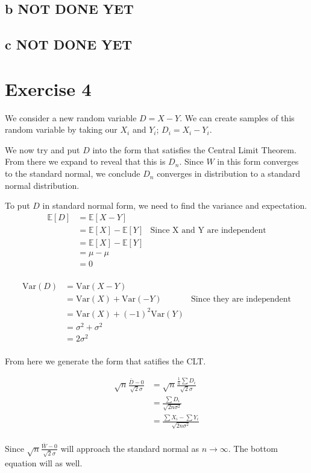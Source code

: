 \documentclass{article}
\newcommand{\expect}{\mathbb{E}}
\newcommand{\var}{\text{Var}}
\begin{document}
\subsection{b NOT DONE YET}

\subsection{c NOT DONE YET}

\section{Exercise 4}
We consider a new random variable $D = X - Y$. We can create samples of this
random variable by taking our $X_i$ and $Y_i$; $D_i = X_i - Y_i$.

We now try and put $D$ into the form that satisfies the Central Limit Theorem.
From there we expand to reveal that this is $D_n$. Since $W$ in this form
converges to the standard normal, we conclude $D_n$ converges in distribution
to a standard normal distribution.

To put $D$ in standard normal form, we need to find the variance and expectation.
\begin{align*}
    \expect [D] &= \expect [X - Y] \\
    &= \expect [X] - \expect [Y] & \text{Since X and Y are independent} \\
    &= \expect [X] - \expect [Y] \\
    &= \mu - \mu \\
    &= 0 \\
\end{align*}

\begin{align*}
    \var (D) &= \var (X - Y) \\
    &= \var (X)+ \var(-Y) & \text{Since they are independent} \\
    &= \var (X)+ {(-1)}^2 \var(Y) \\
    &= \sigma^2 + \sigma^2 \\
    &= 2 \sigma^2 \\
\end{align*}

From here we generate the form that satifies the CLT\@.

\begin{align*}
    \sqrt{n} \frac{\bar{D} - 0}{\sqrt{2} \sigma}
    &= \sqrt{n} \frac{\frac{1}{n}\sum D_i}{\sqrt{2} \sigma} \\
    &= \frac{\sum D_i}{\sqrt{2n\sigma^2}} \\
    &= \frac{\sum X_i - \sum Y_i}{\sqrt{2n\sigma^2}} \\
\end{align*}

Since $\sqrt{n} \frac{\bar{W} - 0}{\sqrt{2} \sigma}$ will approach the standard
normal as $n \to \infty$. The bottom equation will as well.
\end{document}
